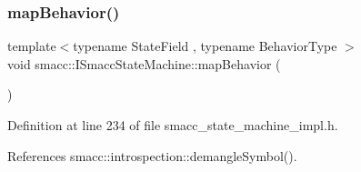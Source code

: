 \subsubsection{\texorpdfstring{map\+Behavior()}{mapBehavior()}}
{\footnotesize\ttfamily template$<$typename State\+Field , typename Behavior\+Type $>$ \\
void smacc\+::\+I\+Smacc\+State\+Machine\+::map\+Behavior (\begin{DoxyParamCaption}{ }\end{DoxyParamCaption})}



Definition at line 234 of file smacc\+\_\+state\+\_\+machine\+\_\+impl.\+h.



References smacc\+::introspection\+::demangle\+Symbol().



